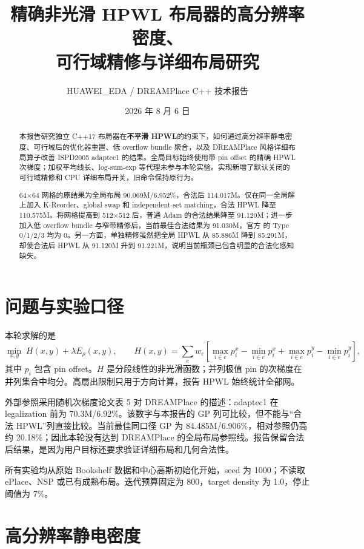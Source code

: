 \documentclass[11pt,a4paper]{ctexart}
\title{精确非光滑 HPWL 布局器的高分辨率密度、\\可行域精修与详细布局研究}
\author{HUAWEI\_EDA / DREAMPlace C++ 技术报告}
\date{2026 年 8 月 6 日}
\newcommand{\code}[1]{\texttt{\detokenize{#1}}}
\begin{document}
\maketitle

\begin{abstract}
本报告研究独立 C++17 布局器在\textbf{不平滑 HPWL}的约束下，如何通过高分辨率静电密度、可行域后的优化器重置、低 overflow bundle 聚合，以及 DREAMPlace 风格详细布局算子改善 ISPD2005 adaptec1 的结果。全局目标始终使用带 pin offset 的精确 HPWL 次梯度；加权平均线长、log-sum-exp 等代理未参与本轮实验。实现新增了默认关闭的可行域精修和 CPU 详细布局开关，旧命令保持原行为。

64$\times$64 网格的原结果为全局布局 90.069M/6.952\%，合法后 114.017M。仅在同一全局解上加入 K-Reorder、global swap 和 independent-set matching，合法 HPWL 降至 110.575M。将网格提高到 512$\times$512 后，普通 Adam 的合法结果降至 91.120M；进一步加入低 overflow bundle 与窄带精修后，当前最佳合法结果为 91.030M，官方 \code{legal2.pl} 的 Type 0/1/2/3 均为 0。另一方面，单独精修虽然把全局 HPWL 从 85.886M 降到 85.291M，却使合法后 HPWL 从 91.120M 升到 91.221M，说明当前瓶颈已包含明显的合法化感知缺失。
\end{abstract}

\section{问题与实验口径}

本轮求解的是
\begin{equation}
  \min_{x,y}\; H(x,y)+\lambda E_\rho(x,y),
  \qquad
  H(x,y)=\sum_{e}w_e\left[
  \max_{i\in e}p^x_i-\min_{i\in e}p^x_i+
  \max_{i\in e}p^y_i-\min_{i\in e}p^y_i\right],
  \label{eq:objective}
\end{equation}
其中 $p_i$ 包含 pin offset。$H$ 是分段线性的非光滑函数；并列极值 pin 的次梯度在并列集合中均分。高扇出限制只用于方向计算，报告 HPWL 始终统计全部网。

外部参照采用随机次梯度论文表 5 对 DREAMPlace 的描述：adaptec1 在 legalization 前为 70.3M/6.92\%。该数字与本报告的 GP 列可比较，但不能与“合法 HPWL”列直接比较。当前最佳同口径 GP 为 84.485M/6.906\%，相对参照仍高约 20.18\%；因此本轮没有达到 DREAMPlace 的全局布局参照线。报告保留合法后结果，是因为用户目标还要求验证详细布局和几何合法性。

所有实验均从原始 Bookshelf 数据和中心高斯初始化开始，seed 为 1000；不读取 ePlace、NSP 或已有成熟布局。迭代预算固定为 800，target density 为 1.0，停止阈值为 7\%。

\section{高分辨率静电密度}
\end{document}
